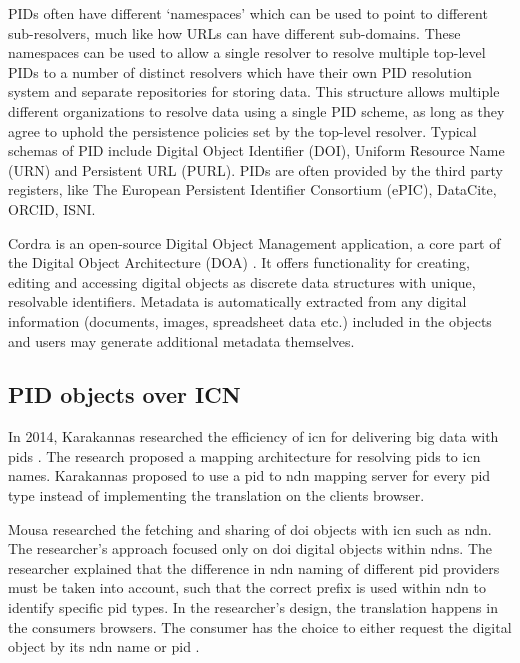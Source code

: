 \documentclass[conference]{IEEEtran}
\begin{document}
PIDs often have different `namespaces' which can be used to point to different sub-resolvers, much like how URLs can have different sub-domains. These namespaces can be used to allow a single resolver to resolve multiple top-level PIDs to a number of distinct resolvers which have their own PID resolution system and separate repositories for storing data. This structure allows multiple different organizations to resolve data using a single PID scheme, as long as they agree to uphold the persistence policies set by the top-level resolver. Typical schemas of PID include Digital Object Identifier (DOI), Uniform Resource Name (URN) and Persistent URL (PURL). PIDs are often provided by the third party registers, like The European Persistent Identifier Consortium (ePIC), DataCite, ORCID, ISNI. 


Cordra \cite{cordra} is an open-source Digital Object Management application, a core part of the Digital Object Architecture (DOA) \cite{sharp2016overview}. It offers functionality for creating, editing and accessing digital objects as discrete data structures with unique, resolvable identifiers. Metadata is automatically extracted from any digital information (documents, images, spreadsheet data etc.) included in the objects and users may generate additional metadata themselves.

\subsection{PID objects over ICN}
In 2014, Karakannas researched the efficiency of \gls{icn} for delivering big data with \glspl{pid} \cite{icn-bd}. The research proposed a mapping architecture for resolving \glspl{pid} to \gls{icn} names. Karakannas proposed to use a \gls{pid} to \gls{ndn} mapping server for every \gls{pid} type instead of implementing the translation on the clients browser.

Mousa researched the fetching and sharing of \gls{doi} objects with \gls{icn} such as \gls{ndn}. The researcher's approach focused only on \gls{doi} digital objects within \glspl{ndn}. The researcher explained that the difference in \gls{ndn} naming of different \gls{pid} providers must be taken into account, such that the correct prefix is used within \gls{ndn} to identify specific \gls{pid} types. In the researcher's design, the translation happens in the consumers browsers. The consumer has the choice to either request the digital object by its \gls{ndn} name or \gls{pid} \cite{ndn-app-aware}.
\end{document}
